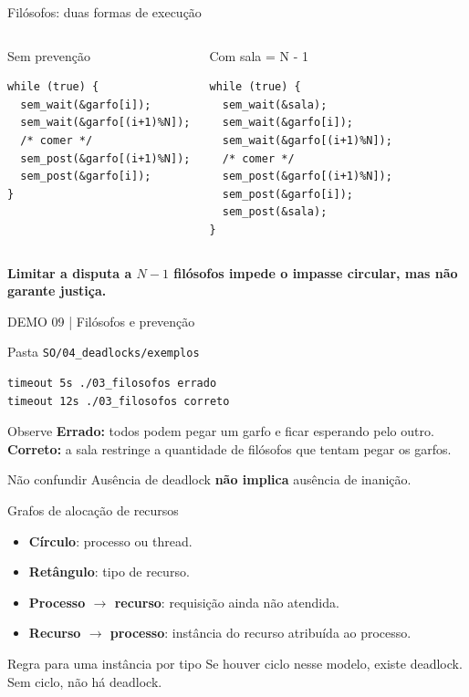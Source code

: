 \documentclass[aspectratio=169,11pt]{beamer}
\begin{document}
\begin{frame}[fragile]{Filósofos: duas formas de execução}
\scriptsize
\begin{columns}[T,onlytextwidth]
\begin{alertblock}{Sem prevenção}
\begin{verbatim}
while (true) {
  sem_wait(&garfo[i]);
  sem_wait(&garfo[(i+1)%N]);
  /* comer */
  sem_post(&garfo[(i+1)%N]);
  sem_post(&garfo[i]);
}
\end{verbatim}
\end{alertblock}
\begin{block}{Com sala = N - 1}
\begin{verbatim}
while (true) {
  sem_wait(&sala);
  sem_wait(&garfo[i]);
  sem_wait(&garfo[(i+1)%N]);
  /* comer */
  sem_post(&garfo[(i+1)%N]);
  sem_post(&garfo[i]);
  sem_post(&sala);
}
\end{verbatim}
\end{block}
\end{columns}
\vspace{.25cm}
\textbf{Limitar a disputa a $N-1$ filósofos impede o impasse circular, mas não garante justiça.}
\end{frame}

\begin{frame}[fragile]{DEMO 09 | Filósofos e prevenção}
\small
\begin{block}{Pasta \texttt{SO/04\_deadlocks/exemplos}}
\begin{verbatim}
timeout 5s ./03_filosofos errado
timeout 12s ./03_filosofos correto
\end{verbatim}
\end{block}
\begin{exampleblock}{Observe}
\textbf{Errado:} todos podem pegar um garfo e ficar esperando pelo outro.\\
\textbf{Correto:} a sala restringe a quantidade de filósofos que tentam pegar os garfos.
\end{exampleblock}
\begin{alertblock}{Não confundir}
Ausência de deadlock \textbf{não implica} ausência de inanição.
\end{alertblock}
\end{frame}

\begin{frame}{Grafos de alocação de recursos}
\small
\begin{itemize}
\setlength\itemsep{.75em}
\item \textbf{Círculo}: processo ou thread.
\item \textbf{Retângulo}: tipo de recurso.
\item \textbf{Processo $\to$ recurso}: requisição ainda não atendida.
\item \textbf{Recurso $\to$ processo}: instância do recurso atribuída ao processo.
\end{itemize}
\begin{block}{Regra para uma instância por tipo}
Se houver ciclo nesse modelo, existe deadlock. Sem ciclo, não há deadlock.
\end{block}
\end{frame}
\end{document}
